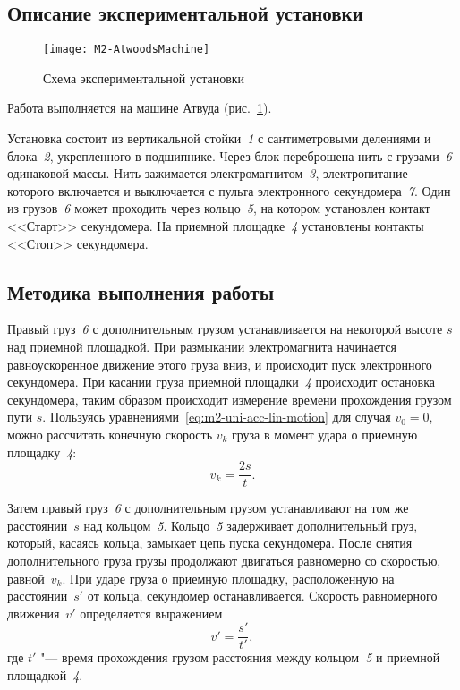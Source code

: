 \documentclass[a4paper, 12pt]{extarticle}
\begin{document}
\subsection{Описание экспериментальной установки}
\begin{figure}[h] %
\begin{center}
\texttt{[image: M2-AtwoodsMachine]}
\end{center}
\caption{Схема экспериментальной установки \label{fig:m2-atwood-machine}}
\end{figure}
Работа выполняется на машине Атвуда (рис.~\ref{fig:m2-atwood-machine}).

Установка состоит из вертикальной стойки~\emph{1} с сантиметровыми делениями и блока~\emph{2}, укрепленного в подшипнике. Через блок переброшена нить с грузами~\emph{6} одинаковой массы. Нить зажимается электромагнитом~\emph{3}, электропитание которого включается и выключается с пульта электронного секундомера~\emph{7}. Один из грузов~\emph{6} может проходить через кольцо~\emph{5}, на котором установлен контакт <<Старт>> секундомера. На приемной площадке~\emph{4} установлены контакты <<Стоп>> секундомера.

\subsection{Методика выполнения работы}
Правый груз~\emph{6} с дополнительным грузом устанавливается на некоторой высоте $s$ над приемной площадкой. При размыкании электромагнита начинается равноускоренное движение этого груза вниз, и происходит пуск электронного секундомера. При касании груза приемной площадки~\emph{4} происходит остановка секундомера, таким образом происходит измерение времени прохождения грузом пути $s$. Пользуясь уравнениями~\eqref{eq:m2-uni-acc-lin-motion} для случая $v_0 = 0$, можно рассчитать конечную скорость $v_k$ груза в момент удара о приемную площадку~\emph{4}:
\begin{equation}
\label{eq:m2-final-speed}
v_k = \frac{2s}{t}.
\end{equation}

Затем правый груз~\emph{6} с дополнительным грузом устанавливают на том же расстоянии~$s$ над кольцом~\emph{5}. Кольцо~\emph{5} задерживает дополнительный груз, который, касаясь кольца, замыкает цепь пуска секундомера. После снятия дополнительного груза грузы продолжают двигаться равномерно со скоростью, равной~$v_k$. При ударе груза о приемную площадку, расположенную на расстоянии~$s'$ от кольца, секундомер останавливается. Скорость равномерного движения~$v'$ определяется выражением 
\begin{equation}
\label{eq:m2-constant-motion-speed}
v' = \frac{s'}{t'},
\end{equation}
где $t'$ "--- время прохождения грузом расстояния между кольцом~\emph{5} и приемной площадкой~\emph{4}. %
\end{document}
